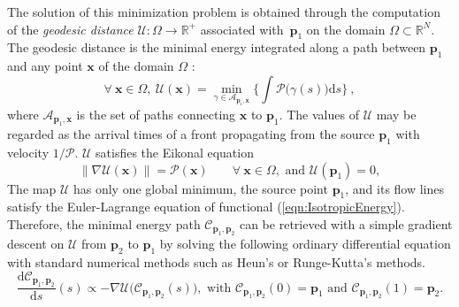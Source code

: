 \documentclass{InsightArticle}
\begin{document}
The solution of this minimization problem is obtained through the computation of the \textit{geodesic distance} $\mathcal{U}:\Omega\rightarrow\mathbb{R}^{+}$ associated with~$\mathbf{p}_{1}$ on the domain $\Omega\subset\mathbb{R}^N$. The geodesic distance is the minimal energy integrated along a path between $\mathbf{p}_{1}$ and any point $\mathbf{x}$ of the domain $\Omega$ :
\begin{equation}\label{eqn:minimalactionmap1}
\forall~\mathbf{x}\in\Omega,~\mathcal{U}(\mathbf{x})=
\min_{\gamma \in \mathcal{A}_{\mathbf{p}_{1},\mathbf{x}}}
\Bigg\{ \int \mathcal{P}\big(\gamma(s) \big) \mathrm{d}s \Bigg\}~,
\end{equation}
where $\mathcal{A}_{\mathbf{p}_{1},\mathbf{x}}$ is the set of paths connecting $\mathbf{x}$ to $\mathbf{p}_{1}$.
The values of $\mathcal{U}$ may be regarded as the arrival times of a front propagating 
from the source $\mathbf{p}_{1}$ with velocity  $1/\mathcal{P}$.
$\mathcal{U}$ satisfies the Eikonal equation
\begin{equation}\label{eqn:eikonal1}
\|\nabla \mathcal{U}(\mathbf{x})\| =  \mathcal{P(\mathbf{x})} \; \; \; \; \; \; \; \forall~\mathbf{x}\in\Omega,\text{ and }   \mathcal{U}(\mathbf{p}_{1}) = 0,
\end{equation}
The map $\mathcal{U}$ has only one global minimum, the source point $\mathbf{p}_{1}$, and its flow lines satisfy the Euler-Lagrange equation of functional (\ref{eqn:IsotropicEnergy}). Therefore, the minimal energy path $\mathcal{C}_{\mathbf{p}_{1},\mathbf{p}_{2}}$ can be retrieved with a simple gradient descent on $\mathcal{U}$ from $\mathbf{p}_{2}$ to $\mathbf{p}_{1}$ by solving the following ordinary differential equation with standard numerical methods such as Heun's or Runge-Kutta's methods.
\begin{equation}\label{eqn:gradientdescent1}
\displaystyle\frac{\mathrm{d} \mathcal{C}_{\mathbf{p}_{1},\mathbf{p}_{2}}}{\mathrm{d}s} (s) \propto 
 -\nabla\mathcal{U}\big(\mathcal{C}_{\mathbf{p}_{1},\mathbf{p}_{2}}(s)\big),\text{ with }\mathcal{C}_{\mathbf{p}_{1},\mathbf{p}_{2}}(0) = \mathbf{p}_{1}  \text{ and }\mathcal{C}_{\mathbf{p}_{1},\mathbf{p}_{2}}(1) = \mathbf{p}_{2}.
\end{equation}
\end{document}
